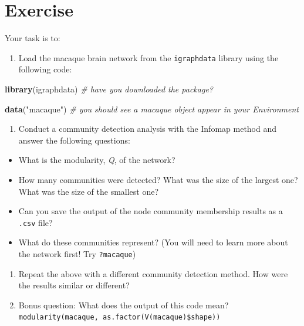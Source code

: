 \documentclass[
]{book}
\newenvironment{Shaded}{\begin{snugshade}}{\end{snugshade}}
\newcommand{\CommentTok}[1]{\textcolor[rgb]{0.56,0.35,0.01}{\textit{#1}}}
\newcommand{\FunctionTok}[1]{\textcolor[rgb]{0.13,0.29,0.53}{\textbf{#1}}}
\newcommand{\NormalTok}[1]{#1}
\newcommand{\StringTok}[1]{\textcolor[rgb]{0.31,0.60,0.02}{#1}}
\providecommand{\tightlist}{%
  \setlength{\itemsep}{0pt}\setlength{\parskip}{0pt}}
\begin{document}
\section{Exercise}\label{exercise-8}

Your task is to:

\begin{enumerate}
\def\labelenumi{\arabic{enumi}.}
\tightlist
\item
  Load the macaque brain network from the \texttt{igraphdata} library using the following code:
\end{enumerate}

\begin{Shaded}
\begin{Highlighting}[]
\FunctionTok{library}\NormalTok{(igraphdata) }\CommentTok{\# have you downloaded the package? }

\FunctionTok{data}\NormalTok{(}\StringTok{"macaque"}\NormalTok{) }\CommentTok{\# you should see a macaque object appear in your Environment}
\end{Highlighting}
\end{Shaded}

\begin{enumerate}
\def\labelenumi{\arabic{enumi}.}
\setcounter{enumi}{1}
\tightlist
\item
  Conduct a community detection analysis with the Infomap method and answer the following questions:
\end{enumerate}

\begin{itemize}
\tightlist
\item
  What is the modularity, \emph{Q}, of the network?
\item
  How many communities were detected? What was the size of the largest one? What was the size of the smallest one?
\item
  Can you save the output of the node community membership results as a \texttt{.csv} file?
\item
  What do these communities represent? (You will need to learn more about the network first! Try \texttt{?macaque})
\end{itemize}

\begin{enumerate}
\def\labelenumi{\arabic{enumi}.}
\setcounter{enumi}{2}
\item
  Repeat the above with a different community detection method. How were the results similar or different?
\item
  Bonus question: What does the output of this code mean? \texttt{modularity(macaque,\ as.factor(V(macaque)\$shape))}
\end{enumerate}
\end{document}
